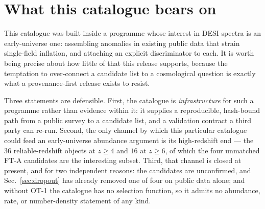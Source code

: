 \documentclass[aps,prd,twocolumn,superscriptaddress,nofootinbib,longbibliography,floatfix]{revtex4-2}
\begin{document}
\section{What this catalogue bears on}
\label{sec:context}

This catalogue was built inside a programme whose interest in DESI spectra is
an early-universe one: assembling anomalies in existing public data that
strain single-field inflation, and attaching an explicit discriminator to
each. It is worth being precise about how little of that this release
supports, because the temptation to over-connect a candidate list to a
cosmological question is exactly what a provenance-first release exists to
resist.

Three statements are defensible. First, the catalogue is
\emph{infrastructure} for such a programme rather than evidence within it: it
supplies a reproducible, hash-bound path from a public survey to a candidate
list, and a validation contract a third party can re-run. Second, the only
channel by which this particular catalogue could feed an early-universe
abundance argument is its high-redshift end --- the $36$ reliable-redshift
objects at $z \ge 4$ and $16$ at $z \ge 6$, of which the four unmatched FT-A
candidates are the interesting subset. Third, that channel is closed at
present, and for two independent reasons: the candidates are unconfirmed, and
Sec.~\ref{sec:dropout} has already removed one of four on public data alone;
and without OT-1 the catalogue has no selection function, so it admits no
abundance, rate, or number-density statement of any kind.
\end{document}
